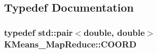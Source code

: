 \subsection{Typedef Documentation}
\hypertarget{namespaceKMeans__MapReduce_a8dfbbc4a186c8ea8ae691f4a85db53e3}{
\subsubsection[{C\-O\-O\-R\-D}]{\setlength{\rightskip}{0pt plus 5cm}typedef std\-::pair$<$double, double$>$ {\bf K\-Means\-\_\-\-Map\-Reduce\-::\-C\-O\-O\-R\-D}}}\label{namespaceKMeans__MapReduce_a8dfbbc4a186c8ea8ae691f4a85db53e3}


